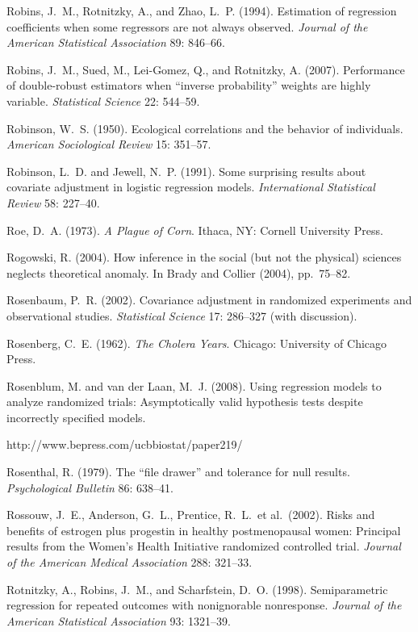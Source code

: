 \smallskip\noindent
Robins, J.~M., Rotnitzky, A., and Zhao, L.~P. (1994).
Estimation of regression coefficients when some regressors are not always observed.
{\it Journal of the American Statistical Association\/} 89: 846--66.

\smallskip\noindent
Robins, J.~M., Sued, M., Lei-Gomez, Q., and Rotnitzky, A. (2007).
Performance of double-robust estimators when ``inverse probability'' weights are highly variable.
{\it Statistical Science\/} 22: 544--59.

\smallskip\noindent
Robinson, W.~S. (1950).
Ecological correlations and the behavior of individuals.
{\it American Sociological Review\/} 15: 351--57.

\smallskip\noindent
Robinson, L.~D. and Jewell, N.~P. (1991).
Some surprising results about covariate adjustment in logistic regression models.
{\it International Statistical Review\/} {58}: 227--40.

\smallskip\noindent
Roe, D.~A. (1973).
{\it A Plague of Corn\/}.
Ithaca, NY: Cornell University Press.

\smallskip\noindent
Rogowski, R. (2004).
How inference in the social (but not the physical) sciences neglects theoretical anomaly.
In Brady and Collier (2004), pp.~75--82.

\smallskip\noindent
Rosenbaum, P.~R. (2002).
Covariance adjustment in randomized experiments and observational studies.
{\it Statistical Science\/} {17}: 286--327 (with discussion).

\smallskip\noindent
Rosenberg, C.~E. (1962).
{\it The Cholera Years\/}.
Chicago: University of Chicago Press.

\vfill\eject
\smallskip\noindent
Rosenblum, M. and van der Laan, M.~J. (2008).
Using regression models to analyze randomized trials:
Asymptotically valid hypothesis tests despite incorrectly specified models.

\noindent \hskip 10pt
http://www.bepress.com/ucbbiostat/paper219/

\smallskip\noindent
Rosenthal, R. (1979).
The ``file drawer'' and tolerance for null results.
{\it Psychological Bulletin\/} 86: 638--41.

\smallskip\noindent
Rossouw, J.~E., Anderson, G.~L., Prentice, R.~L.~et al.~(2002).
Risks and benefits of estrogen plus progestin in healthy postmenopausal women:
Principal results from the Women's Health Initiative randomized controlled trial.
{\it Journal of the American Medical Association\/} 288: 321--33.

\smallskip\noindent
Rotnitzky, A., Robins, J.~M., and Scharfstein, D.~O. (1998).
Semiparametric regression for repeated outcomes with nonignorable nonresponse.
{\it Journal of the American Statistical Association\/} 93: 1321--39.

